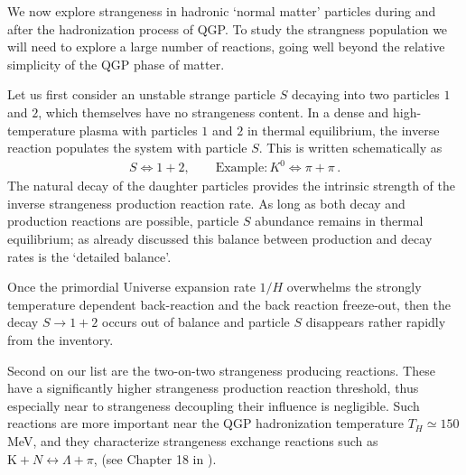We now explore strangeness in hadronic `normal matter' particles during and after the hadronization process of QGP. To study the strangness population we will need to explore a large number of reactions, going well beyond the relative simplicity of the QGP phase of  matter. 

Let us first consider an unstable strange particle $S$ decaying into two particles $1$ and $2$, which themselves have no strangeness content. In a dense and high-temperature plasma with particles $1$ and $2$ in thermal equilibrium, the inverse reaction populates the system with particle $S$. This is written schematically as
\begin{align}
 S\Longleftrightarrow1+2,\qquad \mathrm{Example}: K^0\Longleftrightarrow\pi+\pi\,.
\end{align}
The natural decay of the daughter particles provides the intrinsic strength of the inverse strangeness production reaction rate. As long as both decay and production reactions are possible, particle $S$ abundance remains in thermal equilibrium; as already discussed this balance between production and decay rates is the `detailed balance'.

Once the primordial Universe expansion rate $1/H$ overwhelms the strongly temperature dependent back-reaction and the back reaction freeze-out, then the decay $S\rightarrow 1+2$ occurs out of balance and particle $S$ disappears rather rapidly from the inventory. 

Second on our list are the two-on-two strangeness producing reactions. These have a significantly higher strangeness production reaction threshold, thus especially near to strangeness decoupling their influence is negligible. Such reactions are more important near the QGP hadronization temperature $T_H\simeq 150$\,MeV, and they characterize strangeness exchange reactions such as $\mathrm{K}+N\leftrightarrow \Lambda+\pi$, (see Chapter 18 in \cite{Letessier:2002ony}).

